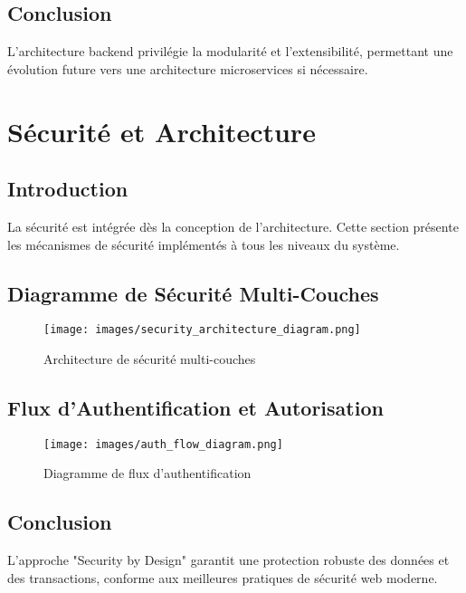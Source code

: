 \subsection{Conclusion}

L'architecture backend privilégie la modularité et l'extensibilité, permettant une évolution future vers une architecture microservices si nécessaire.

\section{Sécurité et Architecture}

\subsection{Introduction}

La sécurité est intégrée dès la conception de l'architecture. Cette section présente les mécanismes de sécurité implémentés à tous les niveaux du système.

\subsection{Diagramme de Sécurité Multi-Couches}

\begin{figure}[H]
    \centering
    \texttt{[image: images/security\_architecture\_diagram.png]}
    \caption{Architecture de sécurité multi-couches}
    \label{fig:security_architecture}
\end{figure}

\subsection{Flux d'Authentification et Autorisation}

\begin{figure}[H]
    \centering
    \texttt{[image: images/auth\_flow\_diagram.png]}
    \caption{Diagramme de flux d'authentification}
    \label{fig:auth_flow}
\end{figure}

\subsection{Conclusion}

L'approche "Security by Design" garantit une protection robuste des données et des transactions, conforme aux meilleures pratiques de sécurité web moderne.

